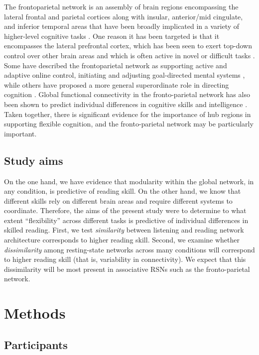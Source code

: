 The frontoparietal network is an assembly of brain regions encompassing the lateral frontal and parietal cortices along with insular, anterior/mid cingulate, and inferior temporal areas that have been broadly implicated in a variety of higher-level cognitive tasks \citep{Fedorenko2013}. One reason it has been targeted is that it encompasses the lateral prefrontal cortex, which has been seen to exert top-down control over other brain areas and which is often active in novel or difficult tasks \citep{Duncan2010}. Some have described the frontoparietal network as supporting active and adaptive online control, initiating and adjusting goal-directed mental systems \citep{Dosenbach2007}, while others have proposed a more general superordinate role in directing cognition \citep{Niendam2012}.  Global functional connectivity in the fronto-parietal network has also been shown to predict individual differences in cognitive skills and intelligence \citep{Cole2011}. Taken together, there is significant evidence for the importance of hub regions in supporting flexible cognition, and the fronto-parietal network may be particularly important. 

\subsection{Study aims}

On the one hand, we have evidence that modularity within the global network, in any condition, is predictive of reading skill. On the other hand, we know that different skills rely on different brain areas and require different systems to coordinate. Therefore, the aims of the present study were to determine to what extent ``flexibility'' across different tasks is predictive of individual differences in skilled reading.  First, we test \textit{similarity} between listening and reading network architecture corresponds to higher reading skill. Second, we examine whether \textit{dissimilarity} among resting-state networks across many conditions will correspond to higher reading skill (that is, variability in connectivity). We expect that this dissimilarity will be most present in associative RSNs such as the fronto-parietal network. 


\section{Methods}

\subsection{Participants}

